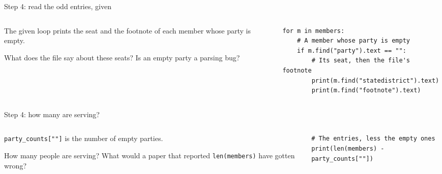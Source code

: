 \documentclass[9pt,aspectratio=169]{beamer}
\begin{document}
\begin{frame}[fragile]{Step 4: read the odd entries, given}
    \begin{columns}[T]
        \begin{column}{0.37\textwidth}
            The given loop prints the seat and the footnote of each member whose party is empty.

            \medskip
            What does the file say about these seats? Is an empty party a parsing bug?
        \end{column}
        \begin{column}{0.6\textwidth}
\begin{lstlisting}
for m in members:
    # A member whose party is empty
    if m.find("party").text == "":
        # Its seat, then the file's footnote
        print(m.find("statedistrict").text)
        print(m.find("footnote").text)
\end{lstlisting}
        \end{column}
    \end{columns}
\end{frame}

\begin{frame}[fragile]{Step 4: how many are serving?}
    \begin{columns}[T]
        \begin{column}{0.37\textwidth}
            \texttt{party\_counts[""]} is the number of empty parties.

            \medskip
            How many people are serving? What would a paper that reported \texttt{len(members)} have gotten wrong?
        \end{column}
        \begin{column}{0.6\textwidth}
\begin{lstlisting}
# The entries, less the empty ones
print(len(members) - party_counts[""])
\end{lstlisting}
        \end{column}
    \end{columns}
\end{frame}
\end{document}
